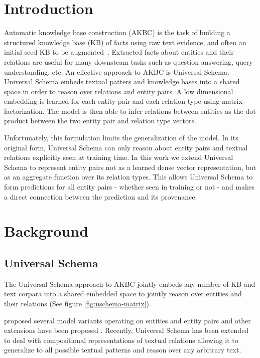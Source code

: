 
\section{Introduction\label{introduction}}

Automatic knowledge base construction (AKBC) is the task of building a structured knowledge base (KB) of facts using raw text evidence, and often an initial seed KB to be augmented~\citep{NELL,yago,freebase}.
Extracted facts about entities and their relations are useful for many downsteam tasks such as question answering, query understanding, etc.
An effective approach to AKBC is Universal Schema.
Universal Schema embeds textual patters and knowledge bases into a shared space in order to reason over relations and entity pairs.
A low dimensional embedding is learned for each entity pair and each relation type using matrix factorization.
The model is then able to infer relations between entities as the dot product between the two entity pair and relation type vectors.

Unfortunately, this formulation limits the generalization of the model.
In its original form, Universal Schema can only reason about entity pairs and textual relations explicitly seen at training time.
In this work we extend Universal Schema to represent entity pairs not as a learned dense vector representation, but as an aggregate function over its relation types.
This allows Universal Schema to form predictions for all entity pairs - whether seen in training or not - and makes a direct connection between the prediction and its provenance.




\section {Background}

\subsection {Universal Schema}
The Universal Schema \citep{limin} approach to AKBC jointly embeds any number of KB and text corpara into a shared embedded space to jointly reason over entities and their relations (See figure \ref {fig:uschema-matrix}).

\citet{limin} proposed several model variants operating on entities and entity pairs and other extensions have been proposed \citep{yao2013universal,vector_pra,neelakantan2015compositional,logicmfnaacl15}. Recently, Universal Schema has been extended to deal with compositional representations of textual relations \citep{toutanova2015representing,verga2015multilingual} allowing it to generalize to all possible textual patterns and reason over any arbitrary text.

